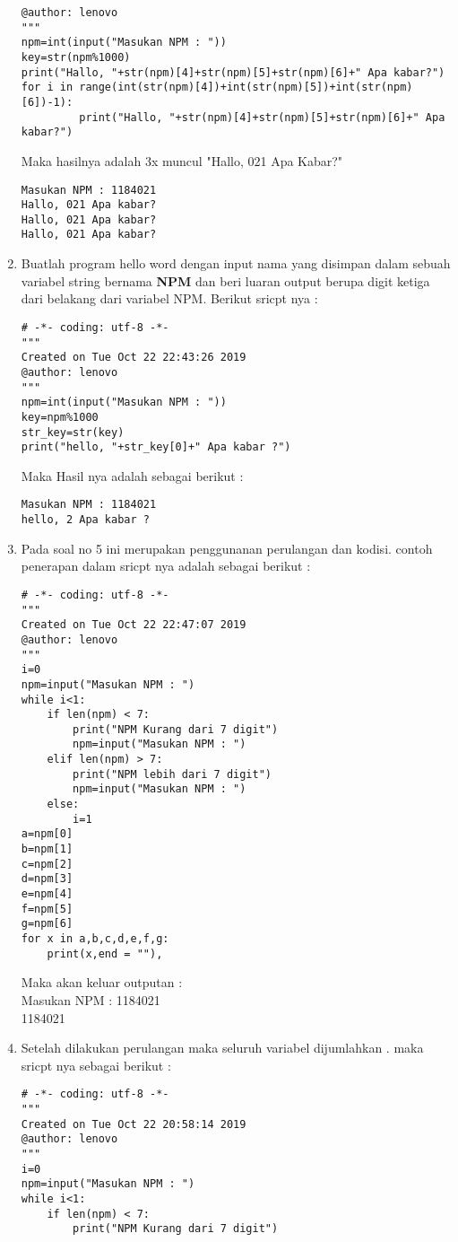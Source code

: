 \begin{enumerate}
\begin{verbatim}
@author: lenovo
"""
npm=int(input("Masukan NPM : "))
key=str(npm%1000)
print("Hallo, "+str(npm)[4]+str(npm)[5]+str(npm)[6]+" Apa kabar?")
for i in range(int(str(npm)[4])+int(str(npm)[5])+int(str(npm)[6])-1):
         print("Hallo, "+str(npm)[4]+str(npm)[5]+str(npm)[6]+" Apa kabar?")
\end{verbatim}
Maka hasilnya adalah 3x muncul "Hallo, 021 Apa Kabar?" 
\begin{verbatim}
Masukan NPM : 1184021
Hallo, 021 Apa kabar?
Hallo, 021 Apa kabar?
Hallo, 021 Apa kabar?
\end{verbatim}
\item
Buatlah program hello word dengan input nama yang disimpan dalam sebuah variabel string bernama \textbf{NPM} dan beri luaran output berupa digit ketiga dari belakang dari variabel NPM. Berikut sricpt nya :
\begin{verbatim}
# -*- coding: utf-8 -*-
"""
Created on Tue Oct 22 22:43:26 2019
@author: lenovo
"""
npm=int(input("Masukan NPM : "))
key=npm%1000
str_key=str(key)
print("hello, "+str_key[0]+" Apa kabar ?")
\end{verbatim}
Maka Hasil nya adalah sebagai berikut :
\begin{verbatim}
Masukan NPM : 1184021
hello, 2 Apa kabar ?
\end{verbatim}
\item
Pada soal no 5 ini merupakan penggunanan perulangan dan kodisi. contoh penerapan dalam sricpt nya adalah sebagai berikut :
\begin{verbatim}
# -*- coding: utf-8 -*-
"""
Created on Tue Oct 22 22:47:07 2019
@author: lenovo
"""
i=0
npm=input("Masukan NPM : ")
while i<1:
    if len(npm) < 7:
        print("NPM Kurang dari 7 digit")
        npm=input("Masukan NPM : ")
    elif len(npm) > 7:
        print("NPM lebih dari 7 digit")
        npm=input("Masukan NPM : ")
    else:
        i=1
a=npm[0]
b=npm[1]
c=npm[2]
d=npm[3]
e=npm[4]
f=npm[5]
g=npm[6]
for x in a,b,c,d,e,f,g:
    print(x,end = ""),
\end{verbatim}
Maka akan keluar outputan : \\
Masukan NPM : 1184021 \\
1184021
\item
Setelah dilakukan perulangan maka seluruh variabel dijumlahkan . maka sricpt nya sebagai berikut :
\begin{verbatim}
# -*- coding: utf-8 -*-
"""
Created on Tue Oct 22 20:58:14 2019
@author: lenovo
"""
i=0
npm=input("Masukan NPM : ")
while i<1:
    if len(npm) < 7:
        print("NPM Kurang dari 7 digit")

\end{verbatim}
\end{enumerate}
